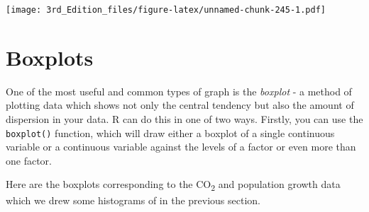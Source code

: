 \documentclass[
]{book}
\newenvironment{Shaded}{\begin{snugshade}}{\end{snugshade}}
\newcommand{\DataTypeTok}[1]{\textcolor[rgb]{0.13,0.29,0.53}{#1}}
\newcommand{\DecValTok}[1]{\textcolor[rgb]{0.00,0.00,0.81}{#1}}
\newcommand{\KeywordTok}[1]{\textcolor[rgb]{0.13,0.29,0.53}{\textbf{#1}}}
\newcommand{\NormalTok}[1]{#1}
\newcommand{\OperatorTok}[1]{\textcolor[rgb]{0.81,0.36,0.00}{\textbf{#1}}}
\newcommand{\OtherTok}[1]{\textcolor[rgb]{0.56,0.35,0.01}{#1}}
\newcommand{\StringTok}[1]{\textcolor[rgb]{0.31,0.60,0.02}{#1}}
\begin{document}
\begin{Shaded}
\end{Shaded}

\texttt{[image: 3rd\_Edition\_files/figure-latex/unnamed-chunk-245-1.pdf]}

\hypertarget{boxplots}{%
\section{Boxplots}\label{boxplots}}

One of the most useful and common types of graph is the \emph{boxplot} - a method of plotting data which shows not only the central tendency but also the amount of dispersion in your data. R can do this in one of two ways. Firstly, you can use the \texttt{boxplot()} function, which will draw either a boxplot of a single continuous variable or a continuous variable against the levels of a factor or even more than one factor.

Here are the boxplots corresponding to the CO\textsubscript{2} and population growth data which we drew some histograms of in the previous section.

\begin{Shaded}
\end{Shaded}
\end{document}
